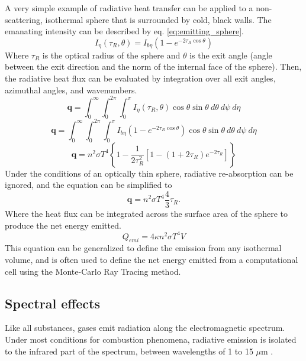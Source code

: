 A very simple example of radiative heat transfer can be applied to a non-scattering, isothermal sphere that is surrounded by cold, black walls. 
The emanating intensity can be described by eq. \ref{eq:emitting_sphere}.
\begin{equation}
    I_\eta{}(\tau{}_R,\theta{}) = I_{b\eta{}}\left(1-e^{-2\tau{}_R\cos{\theta}}\right)
    \label{eq:emitting_sphere}
\end{equation}
Where $\tau{}_R$ is the optical radius of the sphere and $\theta{}$ is the exit angle (angle between the exit direction and the norm of the internal face of the sphere).
Then, the radiative heat flux can be evaluated by integration over all exit angles, azimuthal angles, and wavenumbers.
\begin{equation}
    \textbf{q}=\int_0^\infty{}\int_0^{2\pi}\int_0^{\pi{}}I_\eta{}(\tau{}_R,\theta)\cos{\theta}\sin{\theta}~d\theta{}~d\psi{}~d\eta{}
    \label{eq:heatflux}
\end{equation}
\begin{equation}
    \textbf{q}=\int_0^\infty{}\int_0^{2\pi}\int_0^{\pi{}}I_{b\eta{}}\left(1-e^{-2\tau{}_R\cos{\theta}}\right)\cos{\theta}\sin{\theta}~d\theta{}~d\psi{}~d\eta{}
    \label{eq:heatflux}
\end{equation}
\begin{equation}
    \textbf{q}=n^2\sigma{}T^4\left\{1-\frac{1}{2\tau{}_R^2}\left[1-(1+2\tau{}_R)e^{-2\tau{}_R}\right]\right\}
    \label{eq:heatflux}
\end{equation}
Under the conditions of an optically thin sphere, radiative re-absorption can be ignored, and the equation can be simplified to
\begin{equation}
    \textbf{q}=n^2\sigma{}T^4\frac{4}{3}\tau{}_R.
    \label{eq:heatflux}
\end{equation}
Where the heat flux can be integrated across the surface area of the sphere to produce the net energy emitted.
\begin{equation}
    Q_{emi}=4\kappa{}n^2\sigma{}T^4V
    \label{eq:RadEmis}
\end{equation}
This equation can be generalized to define the emission from any isothermal volume, and is often used to define the net energy emitted from a computational cell using the Monte-Carlo Ray Tracing method.

\subsection{Spectral effects}\label{Sec:Nongray}
Like all substances, gases emit radiation along the electromagnetic spectrum. Under most conditions for combustion phenomena, radiative emission is isolated to the infrared part of the spectrum, between wavelengths of 1 to 15 $\mu{}$m \cite{Liu2020TheFlames}.

